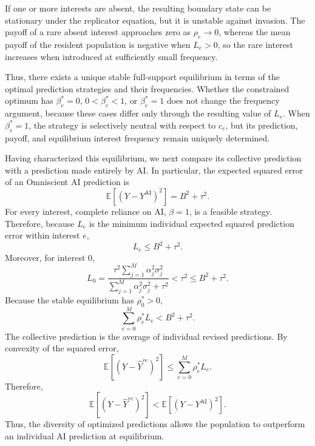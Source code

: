 \documentclass[12pt]{article}
\begin{document}
If one or more interests are absent, the resulting boundary state can be stationary under the replicator equation, but it is unstable against invasion.
The payoff of a rare absent interest approaches zero as $\rho_e\to0$, whereas the mean payoff of the resident population is negative when $L_e>0$, so the rare interest increases when introduced at sufficiently small frequency.

Thus, there exists a unique stable full-support equilibrium in terms of the optimal prediction strategies and their frequencies.
Whether the constrained optimum has $\beta_e^*=0$, $0<\beta_e^*<1$, or $\beta_e^*=1$ does not change the frequency argument, because these cases differ only through the resulting value of $L_e$.
When $\beta_e^*=1$, the strategy is selectively neutral with respect to $c_e$, but its prediction, payoff, and equilibrium interest frequency remain uniquely determined.

Having characterized this equilibrium, we next compare its collective prediction with a prediction made entirely by AI. 
In particular, the expected squared error of an Omniscient AI prediction is
\begin{equation}
\mathbb{E}\left[(Y-Y^{\mathrm{AI}})^2\right] = B^2+\tau^2.
\end{equation}
For every interest, complete reliance on AI, $\beta=1$, is a feasible strategy.
Therefore, because $L_e$ is the minimum individual expected squared prediction error within interest $e$,
\begin{equation}
L_e\leq B^2+\tau^2.
\end{equation}
Moreover, for interest 0,
\begin{equation}
L_0 = \frac{\tau^2\sum_{j=1}^{M}\alpha_j^2\sigma_j^2}{\sum_{j=1}^{M}\alpha_j^2\sigma_j^2+\tau^2}
< \tau^2 \leq B^2+\tau^2.
\end{equation}
Because the stable equilibrium has $\rho_0^*>0$,
\begin{equation}
\sum_{e=0}^{M}\rho_e^*L_e < B^2+\tau^2.
\end{equation}
The collective prediction is the average of individual revised predictions.
By convexity of the squared error,
\begin{equation}
\mathbb{E}\left[(Y-\hat{Y}^{re})^2\right] \leq \sum_{e=0}^{M}\rho_e^*L_e.
\end{equation}
Therefore,
\begin{equation}
\mathbb{E}\left[(Y-\hat{Y}^{re})^2\right] < \mathbb{E}\left[(Y-Y^{\mathrm{AI}})^2\right].
\end{equation}
Thus, the diversity of optimized predictions allows the population to outperform an individual AI prediction at equilibrium.
\end{document}
